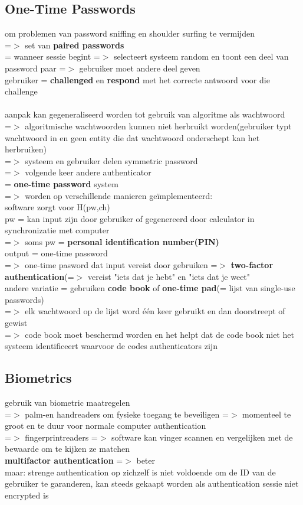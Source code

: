 \documentclass{report}
\begin{document}
\subsection{One-Time Passwords}
om problemen van password sniffing en shoulder surfing te vermijden 
\\=$>$ set van  \textbf{paired passwords}
\\= wanneer sessie begint =$>$ selecteert systeem random en toont een deel van password paar =$>$ gebruiker moet andere deel geven
\\ gebruiker = \textbf{challenged} en \textbf{respond} met het correcte antwoord voor die challenge
\\
\\aanpak kan gegeneraliseerd worden tot gebruik van algoritme als wachtwoord
\\=$>$ algoritmische wachtwoorden kunnen niet herbruikt worden(gebruiker typt wachtwoord in en geen entity die dat wachtwoord onderschept kan het herbruiken)
\\=$>$ systeem en gebruiker delen symmetric password
\\=$>$ volgende keer andere authenticator 
\\= \textbf{one-time password} system
\\=$>$ worden op verschillende manieren ge\"implementeerd:
\\software zorgt voor H(pw,ch)
\\pw = kan input zijn door gebruiker of gegenereerd door calculator in synchronizatie met computer
\\=$>$ soms pw = \textbf{personal identification number(PIN)}
\\output = one-time password
\\=$>$ one-time pasword dat input vereist door gebruiken =$>$ \textbf{two-factor authentication}(=$>$ vereist "iets dat je hebt" en "iets dat je weet"
\\ andere variatie = gebruiken \textbf{code book} of \textbf{one-time pad}(= lijst van single-use passwords)
\\=$>$ elk wachtwoord op de lijst word \'e\'en keer gebruikt en dan doorstreept of gewist
\\=$>$ code book moet beschermd worden en het helpt dat de code book niet het systeem identificeert waarvoor de codes authenticators zijn

\subsection{Biometrics}
gebruik van biometric maatregelen
\\=$>$ palm-en handreaders om fysieke toegang te beveiligen =$>$ momenteel te groot en te duur voor normale computer authentication
\\=$>$ fingerprintreaders =$>$ software kan vinger scannen en vergelijken met de bewaarde om te kijken ze matchen
\\\textbf{multifactor authentication} =$>$ beter
\\ maar: strenge authentication op zichzelf is niet voldoende om de ID van de gebruiker te garanderen, kan  steeds gekaapt worden als authentication sessie niet encrypted is
\end{document}
